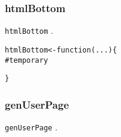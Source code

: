 \documentclass{article}\usepackage[]{graphicx}\usepackage[]{color}
\makeatletter
\newcommand{\hlcom}[1]{\textcolor[rgb]{0.345,0.431,0.459}{#1}}%
\newcommand{\hlstd}[1]{\textcolor[rgb]{0.514,0.58,0.588}{#1}}%
\newcommand{\hlkwa}[1]{\textcolor[rgb]{0.796,0.294,0.086}{#1}}%
\newcommand{\hlkwb}[1]{\textcolor[rgb]{0.522,0.6,0}{#1}}%
\newcommand{\hlkwc}[1]{\textcolor[rgb]{0.796,0.294,0.086}{#1}}%
\newenvironment{kframe}{%
 \def\at@end@of@kframe{}%
 \ifinner\ifhmode%
  \def\at@end@of@kframe{\end{minipage}}%
  \begin{minipage}{\columnwidth}%
 \fi\fi%
 \def\FrameCommand##1{\hskip\@totalleftmargin \hskip-\fboxsep
 \colorbox{shadecolor}{##1}\hskip-\fboxsep
     \hskip-\linewidth \hskip-\@totalleftmargin \hskip\columnwidth}%
 \MakeFramed {\advance\hsize-\width
   \@totalleftmargin\z@ \linewidth\hsize
   \@setminipage}}%
 {\par\unskip\endMakeFramed%
 \at@end@of@kframe}
\newenvironment{knitrout}{}{} %
\makeatother
\begin{document}
\subsubsection{htmlBottom}

\texttt{htmlBottom} .


\begin{knitrout}
\color{fgcolor}\begin{kframe}
\begin{alltt}
\hlstd{htmlBottom} \hlkwb{<-} \hlkwa{function}\hlstd{(}\hlkwc{...}\hlstd{) \{}
    \hlcom{# temporary}











































\hlstd{\}}
\end{alltt}
\end{kframe}
\end{knitrout}

\subsubsection{genUserPage}

\texttt{genUserPage} .
\end{document}
